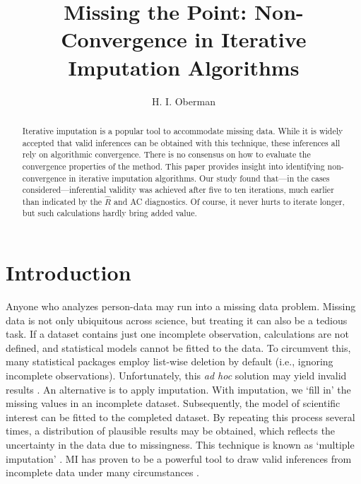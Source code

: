 \documentclass[Royal,times,sageh]{sagej}
\begin{document}
\title{Missing the Point: Non-Convergence in Iterative Imputation Algorithms}


\author{H. I. Oberman}




\begin{abstract}
Iterative imputation is a popular tool to accommodate missing data. While it is widely accepted that valid inferences can be obtained with this technique, these inferences all rely on algorithmic convergence. There is no consensus on how to evaluate the convergence properties of the method. This paper provides insight into identifying non-convergence in iterative imputation algorithms. Our study found that---in the cases considered---inferential validity was achieved after five to ten iterations, much earlier than indicated by the \(\widehat{R}\) and AC diagnostics. Of course, it never hurts to iterate longer, but such calculations hardly bring added value.
\end{abstract}


\maketitle

\hypertarget{introduction}{%
\section{Introduction}\label{introduction}}

Anyone who analyzes person-data may run into a missing data problem. Missing data is not only ubiquitous across science, but treating it can also be a tedious task. If a dataset contains just one incomplete observation, calculations are not defined, and statistical models cannot be fitted to the data. To circumvent this, many statistical packages employ list-wise deletion by default (i.e., ignoring incomplete observations). Unfortunately, this \emph{ad hoc} solution may yield invalid results \citep{buur18}. An alternative is to apply imputation. With imputation, we `fill in' the missing values in an incomplete dataset. Subsequently, the model of scientific interest can be fitted to the completed dataset. By repeating this process several times, a distribution of plausible results may be obtained, which reflects the uncertainty in the data due to missingness. This technique is known as `multiple imputation' \citep[MI;][]{rubin76}. MI has proven to be a powerful tool to draw valid inferences from incomplete data under many circumstances \citep{buur18}.
\end{document}
